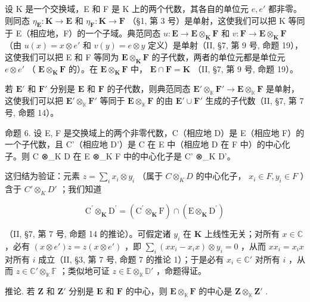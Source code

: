 设 K 是一个交换域，E 和 F 是 K 上的两个代数，其各自的单位元 \(e, e'\) 都非零。则同态 \(\eta_{\mathbf{E}}: \mathbf{K} \to \mathbf{E}\) 和 \(\eta_{\mathbf{F}}: \mathbf{K} \to \mathbf{F}\) （§1, 第 3 号）是单射，这使我们可以把 K 等同于 E（相应地，F）的一个子域。典范同态 \(u: \mathbf{E} \to \mathbf{E} \otimes_{\mathbf{K}} \mathbf{F}\) 和 \(v: \mathbf{F} \to \mathbf{E} \otimes_{\mathbf{K}} \mathbf{F}\) （由 \(u(x) = x \otimes e'\) 和 \(v(y) = e \otimes y\) 定义）是单射（II, §7, 第 9 号, 命题 19），这使我们可以把 E 和 F 等同为 \(\mathbf{E} \otimes_{\mathbf{K}} \mathbf{F}\) 的子代数，两者的单位元都是单位元 \(e \otimes e'\) （ \(\mathbf{E} \otimes_{\mathbf{K}} \mathbf{F}\) 的）。在 \(\mathbf{E} \otimes_{\mathbf{K}} \mathbf{F}\) 中， \(\mathbf{E} \cap \mathbf{F} = \mathbf{K}\) （II, §7, 第 9 号, 命题 19）。

若 \(\mathbf{E}'\) 和 \(\mathbf{F}'\) 分别是 \(\mathbf{E}\) 和 \(\mathbf{F}\) 的子代数，则典范同态 \(\mathbf{E}' \otimes_{\mathbb{K}} \mathbf{F}' \to \mathbf{E} \otimes_{\mathbb{K}} \mathbf{F}\) 是单射，这使我们可以把 \(\mathbf{E}' \otimes_{\mathbb{K}} \mathbf{F}'\) 等同于 \(\mathbf{E} \otimes_{\mathbb{K}} \mathbf{F}\) 的由 \(\mathbf{E}' \cup \mathbf{F}'\) 生成的子代数（II, §7, 第 7 号, 命题 14）。

命题 6. 设 E, F 是交换域上的两个非零代数，C（相应地 D）是 E（相应地 F）的一个子代数，且 C'（相应地 D'）是 C 在 E 中（相应地 D 在 F 中）的中心化子。则 C ⊗\_K D 在 E ⊗\_K F 中的中心化子是 C' ⊗\_K D'。

这归结为验证：元素 \(z = \sum_{i} x_{i} \otimes y_{i}\) （属于 \(C \otimes_{K} D\) 的中心化子， \(x_{i} \in F, y_{i} \in F\) ）含于 \(C' \otimes_{K} D'\) ；我们知道

\[
\mathrm{C} ^ {\prime} \otimes_ {\mathbf {K}} \mathrm{D} ^ {\prime} = (\mathrm{C} ^ {\prime} \otimes_ {\mathbf {K}} \mathrm{F}) \cap (\mathrm{E} \otimes_ {\mathbf {K}} \mathrm{D} ^ {\prime})
\]

（II, §7, 第 7 号, 命题 14 的推论）。可假定诸 \(y_{i}\) 在 \(\mathbf{K}\) 上线性无关；对所有 \(x \in \mathbb{C}\) ，必有 \((x \otimes e')z = z(x \otimes e')\) ，即 \(\sum_{i} (xx_{i} - x_{i}x) \otimes y_{i} = 0\) ，从而 \(xx_{i} = x_{i}x\) 对所有 \(i\) 成立（II, §3, 第 7 号, 命题 7 的推论 1）；于是必有 \(x_{i} \in \mathbb{C}'\) 对所有 \(i\) ，从而 \(z \in \mathbb{C}' \otimes_{\mathbb{K}} \mathbb{F}\) ；类似地可证 \(z \in \mathbb{E} \otimes_{\mathbb{K}} \mathbb{D}'\) ，命题得证。

推论. 若 \(\mathbf{Z}\) 和 \(\mathbf{Z}'\) 分别是 \(\mathbf{E}\) 和 \(\mathbf{F}\) 的中心，则 \(\mathbf{E} \otimes_{\mathbb{K}} \mathbf{F}\) 的中心是 \(\mathbf{Z} \otimes_{\mathbb{K}} \mathbf{Z}'\) .

